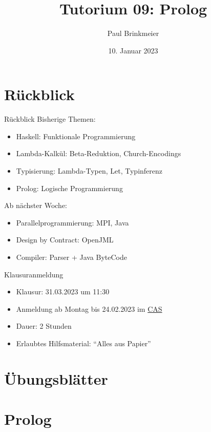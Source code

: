\documentclass{beamer}
\title{Tutorium 09: Prolog}
\author{Paul Brinkmeier}
\institute{Tutorium Programmierparadigmen am KIT}
\date{10. Januar 2023}
\begin{document}
\begin{frame}
    \titlepage
\end{frame}

\section{Rückblick}

\begin{frame}{Rückblick}
    Bisherige Themen:

    \begin{itemize}
        \item Haskell: Funktionale Programmierung
        \item Lambda-Kalkül: Beta-Reduktion, Church-Encodings
        \item Typisierung: Lambda-Typen, Let, Typinferenz
        \item Prolog: Logische Programmierung
    \end{itemize}

    Ab nächster Woche:

    \begin{itemize}
        \item Parallelprogrammierung: MPI, Java
        \item Design by Contract: OpenJML
        \item Compiler: Parser + Java ByteCode
    \end{itemize}
\end{frame}

\begin{frame}{Klausuranmeldung}
    \begin{itemize}
        \item Klausur: 31.03.2023 um 11:30
        \item Anmeldung ab Montag bis 24.02.2023 im \href{https://campus.studium.kit.edu/exams/registration.php?pguid=0x87BA4E33FD4947E8ADAB43370BDFA852}{CAS}
        \item Dauer: 2 Stunden
        \item Erlaubtes Hilfsmaterial: \enquote{Alles aus Papier}
    \end{itemize}
\end{frame}

\section{Übungsblätter}

\section{Prolog}
\end{document}
